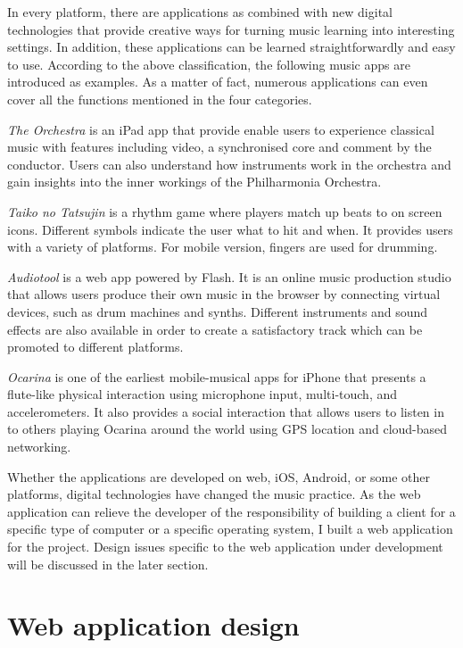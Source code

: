 In every platform, there are applications as combined with new digital technologies that provide creative ways for turning music learning into interesting settings. In addition, these applications can be learned straightforwardly and easy to use. According to the above classification, the following music apps are introduced as examples. As a matter of fact, numerous applications can even cover all the functions mentioned in the four categories. 

\emph{The Orchestra} \cite{theOrchestra} is an iPad app that provide enable users to experience classical music with features including video, a synchronised core and comment by the conductor. Users can also understand how instruments work in the orchestra and gain insights into the inner workings of the Philharmonia Orchestra.

\emph{Taiko no Tatsujin} \cite{taiko} is a rhythm game where players match up beats to on screen icons. Different symbols indicate the user what to hit and when. It provides users with a variety of platforms. For mobile version, fingers are used for drumming.

\emph{Audiotool} \cite{audiotool} is a web app powered by Flash. It is an online music production studio that allows users produce their own music in the browser by connecting virtual devices, such as drum machines and synths. Different instruments and sound effects are also available in order to create a satisfactory track which can be promoted to different platforms.

\emph{Ocarina} \cite{wang2009designing} is one of the earliest mobile-musical apps for iPhone that presents a flute-like physical interaction using microphone input, multi-touch, and accelerometers. It also provides a social interaction that allows users to listen in to others playing Ocarina around the world using GPS location and cloud-based networking.

Whether the applications are developed on web, iOS, Android, or some other platforms, digital technologies have changed the music practice. As the web application can relieve the developer of the responsibility of building a client for a specific type of computer or a specific operating system, I built a web application for the project. Design issues specific to the web application under development will be discussed in the later section.

\section{Web application design}

